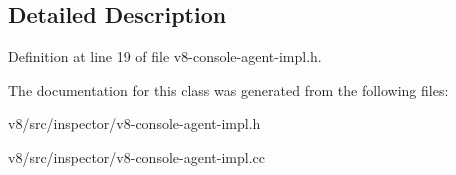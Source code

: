 \subsection{Detailed Description}


Definition at line 19 of file v8-\/console-\/agent-\/impl.\+h.



The documentation for this class was generated from the following files\+:\begin{DoxyCompactItemize}
\item 
v8/src/inspector/v8-\/console-\/agent-\/impl.\+h\item 
v8/src/inspector/v8-\/console-\/agent-\/impl.\+cc\end{DoxyCompactItemize}
